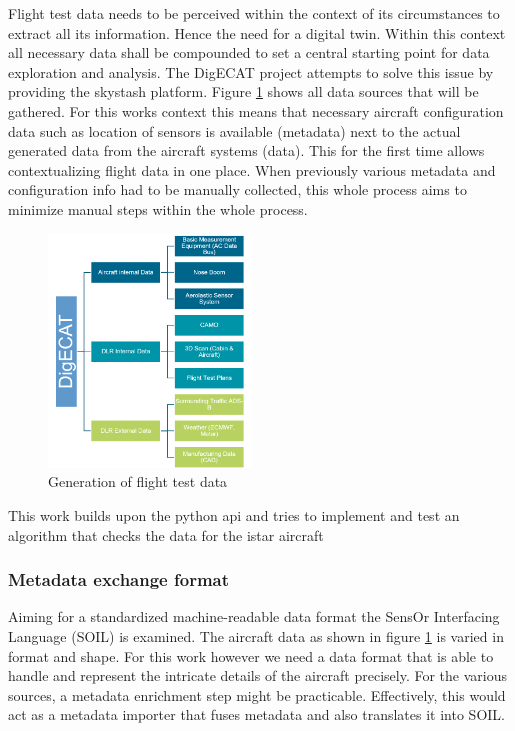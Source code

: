 Flight test data needs to be perceived within the context of its circumstances to extract all its information. Hence the need for a digital twin. Within this context all necessary data shall be compounded to set a central starting point for data exploration and analysis. The DigECAT project attempts to solve this issue by providing the skystash platform. Figure \ref{fig:digecat_data_sources} shows all data sources that will be gathered. For this works context this means that necessary aircraft configuration data such as location of sensors is available (metadata) next to the actual generated data from the aircraft systems (data). This for the first time allows contextualizing flight data in one place. When previously various metadata and configuration info had to be manually collected, this whole process aims to minimize manual steps within the whole process.

\cite{arts_digital_2022}

\begin{figure}
    \centering
    \includegraphics[width=0.48\textwidth]{03_figures/DIGECAT}
    \caption{Generation of flight test data \cite{arts_digital_2022} }
    \label{fig:digecat_data_sources}
\end{figure}
This work builds upon the python api and tries to implement and test an algorithm that checks the data for the istar aircraft
\cite{meyer_development_2020}




\subsubsection{Metadata exchange format}
\label{chap:2-metadata-format}

Aiming for a standardized machine-readable data format the SensOr Interfacing Language (SOIL) is examined. The aircraft data as shown in figure \ref{fig:digecat_data_sources} is varied in format and shape. For this work however we need a data format that is able to handle and represent the intricate details of the aircraft precisely. For the various sources, a metadata enrichment step might be practicable. Effectively, this would act as a metadata importer that fuses metadata and also translates it into SOIL.

